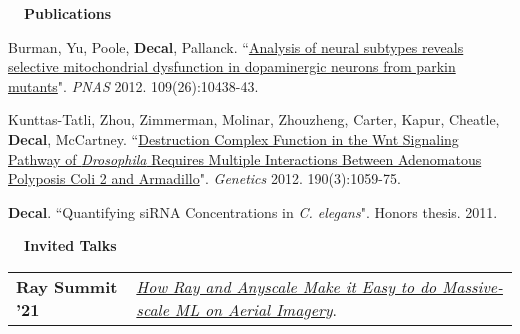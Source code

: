 \documentclass[a4paper,12pt]{article}
\newcommand{\resheading}[1]{{\vspace*{.001in} \colorbox{mygrey}{\begin{minipage}{\textwidth}{\textmd{\large \textbf{#1} \vphantom{p\^{E}}}}\end{minipage}}} }
\begin{document}
%
%

    \resheading{~~Publications}
    \vspace{-1em}
    {\setlength{\parskip}{8pt}

    Burman, Yu, Poole, \textbf{Decal}, Pallanck. ``\href{http://www.pnas.org/content/early/2012/06/12/1120688109}{Analysis of neural subtypes reveals selective mitochondrial dysfunction in dopaminergic neurons from parkin mutants}". \textit{PNAS} 2012. 109(26):10438-43.

    Kunttas-Tatli, Zhou, Zimmerman, Molinar, Zhouzheng, Carter, Kapur, Cheatle, \textbf{Decal}, McCartney. ``\href{http://www.genetics.org/content/190/3/1059.full}{Destruction Complex Function in the Wnt Signaling Pathway of \textit{Drosophila} Requires Multiple Interactions Between Adenomatous Polyposis Coli 2 and Armadillo}". \textit{Genetics} 2012. 190(3):1059-75.

    \textbf{\textbf{Decal}}. ``Quantifying siRNA Concentrations in \textit{C. elegans}". Honors thesis. 2011.\\

    }

    \resheading{~~Invited Talks}
    \vspace{-1.5em}

    \begin{tabularx}{\textwidth}{p{3cm}>{\arraybackslash}X}  %

        \bfseries{Ray Summit '21} & \href{https://www.anyscale.com/events/2021/06/22/how-ray-and-anyscale-make-it-easy-to-do-massive-scale-ml-on-aerial-imagery}{\textit{How Ray and Anyscale Make it Easy to do Massive-scale ML on Aerial Imagery}}.\\
    \end{tabularx}
\end{document}
